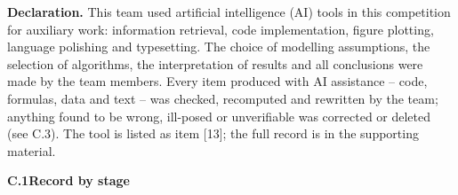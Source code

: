 \documentclass[12pt]{article}
\begin{document}
{\footnotesize
\setlength{\tabcolsep}{2.5pt}
\renewcommand{\arraystretch}{1.03}

\noindent\textbf{Declaration.}
This team used artificial intelligence (AI) tools in this competition for auxiliary work: information retrieval, code implementation, figure plotting, language polishing and typesetting. The choice of modelling assumptions, the selection of algorithms, the interpretation of results and all conclusions were made by the team members. Every item produced with AI assistance -- code, formulas, data and text -- was checked, recomputed and rewritten by the team; anything found to be wrong, ill-posed or unverifiable was corrected or deleted (see C.3). The tool is listed as item [13]; the full record is in the supporting material.

\vspace{4pt}
\noindent\textbf{C.1\quad Record by stage}

}
\end{document}
